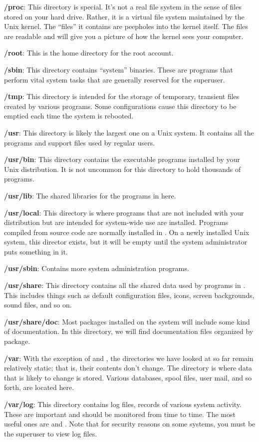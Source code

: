 \item \textbf{/proc}: This directory is special. It's not a real file system in the sense of files stored on
your hard drive. Rather, it is a virtual file system maintained by the Unix kernel. The ``files'' it contains are
peepholes into the kernel itself. The files are readable and will give you a picture of how the kernel sees your
computer.
\item \textbf{/root}: This is the home directory for the root account.
\item \textbf{/sbin}: This directory contains ``system'' binaries. These are programs that perform vital system tasks
that are generally reserved for the superuser.
\item \textbf{/tmp}: This directory is intended for the storage of temporary, transient files created by various
programs. Some configurations cause this directory to be emptied each time the system is rebooted.
\item \textbf{/usr}: This directory is likely the largest one on a Unix system. It contains all the programs and support
files used by regular users.
\item \textbf{/usr/bin}: This directory contains the executable programs installed by your Unix distribution. It is not
uncommon for this directory to hold thousands of programs.
\item \textbf{/usr/lib}: The shared libraries for the programs in here.
\item \textbf{/usr/local}: This directory is where programs that are not included with your distribution but are
intended for system-wide use are installed. Programs compiled from source code are normally installed in
. On a newly installed Unix system, this director exists, but it will be empty until the system
administrator puts something in it.
\item \textbf{/usr/sbin}: Contains more system administration programs.
\item \textbf{/usr/share}: This directory contains all the shared data used by programs in . This
includes things such as default configuration files, icons, screen backgrounds, sound files, and so on.
\item \textbf{/usr/share/doc}: Most packages installed on the system will include some kind of documentation. In this
directory, we will find documentation files organized by package.
\item \textbf{/var}: With the exception of  and , the directories we have looked at so far
remain relatively static; that is, their contents don't change. The  directory is where data that is likely
to change is stored. Various databases, spool files, user mail, and so forth, are located here.
\item \textbf{/var/log}: This directory contains log files, records of various system activity. These are important and
should be monitored from time to time. The most useful ones are  and .
Note that for security reasons on some systems, you must be the superuser to view log files.
\eit

